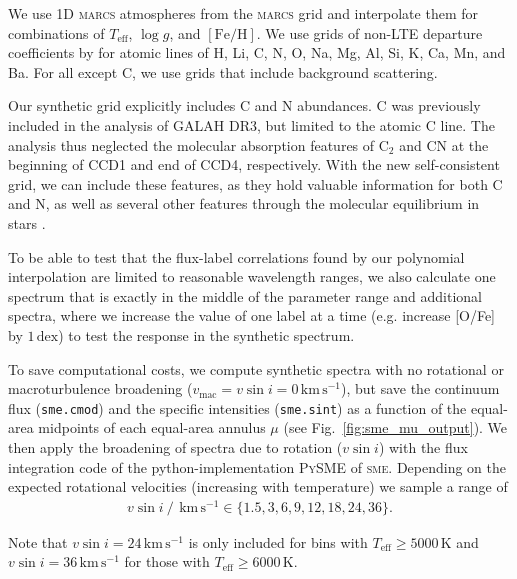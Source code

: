 \documentclass[
  journal=pasa,
  manuscript=research-paper, %
  year=2024,
  volume=37
]{cup-journal}
\newcommand{\Teff}{$T_\mathrm{eff}$\xspace}
\newcommand{\logg}{$\log g$\xspace}
\newcommand{\feh}{$\mathrm{[Fe/H]}$\xspace}
\newcommand{\vsini}{$v \sin i$\xspace}
\newcommand{\sme}{\textsc{sme}\xspace}
\newcommand{\marcs}{\textsc{marcs}\xspace}
\newcommand{\dex}{\,\mathrm{dex}}	%
\newcommand{\kms}{\,\mathrm{km\,s^{-1}}}	%
\begin{document}
We use 1D \marcs atmospheres from the \marcs grid \citep[][version 2014]{Gustafsson2008} and interpolate them for combinations of \Teff, \logg, and \feh. We use grids of non-LTE departure coefficients by \citet{Amarsi2020} for atomic lines of H, Li, C, N, O, Na, Mg, Al, Si, K, Ca, Mn, and Ba. For all except C, we use grids that include background scattering.

Our synthetic grid explicitly includes C and N abundances. C was previously included in the analysis of GALAH DR3, but limited to the atomic C line. The analysis thus neglected the molecular absorption features of $\mathrm{C_2}$ and CN at the beginning of CCD1 and end of CCD4, respectively. With the new self-consistent grid, we can include these features, as they hold valuable information for both C and N, as well as several other features through the molecular equilibrium in stars \citep[see e.g.][]{Ting2018}.

To be able to test that the flux-label correlations found by our polynomial interpolation are limited to reasonable wavelength ranges, we also calculate one spectrum that is exactly in the middle of the parameter range and additional spectra, where we increase the value of one label at a time (e.g. increase [O/Fe] by $1\dex$) to test the response in the synthetic spectrum.

To save computational costs, we compute synthetic spectra with no rotational or macroturbulence broadening ($v_\text{mac} = v\sin i = 0\kms$), but save the continuum flux (\texttt{sme.cmod}) and the specific intensities (\texttt{sme.sint}) as a function of the equal-area midpoints of each equal-area annulus $\mu$ (see Fig.~\ref{fig:sme_mu_output}). We then apply the broadening of spectra due to rotation (\vsini) with the flux integration code of the python-implementation \textsc{PySME} \citep{Wehrhahn2021} of \sme \citep{Piskunov2017}. Depending on the expected rotational velocities (increasing with temperature) we sample a range of
\begin{align} \label{eq:vsini}
    v \sin i~/~\kms \in \{ 1.5, 3, 6, 9, 12, 18, 24, 36\}.
\end{align}

Note that $v \sin i = 24 \kms$ is only included for bins with \Teff$\geq 5000\,\mathrm{K}$ and $v \sin i = 36 \kms$ for those with \Teff$\geq 6000\,\mathrm{K}$.

\end{document}
